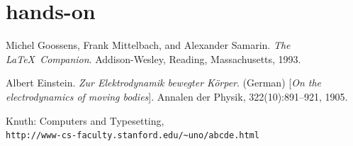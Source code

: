 \documentclass{beamer}
\begin{document}
\section{hands-on}


\begin{thebibliography}{9}
Michel Goossens, Frank Mittelbach, and Alexander Samarin. 
\textit{The \LaTeX\ Companion}. 
Addison-Wesley, Reading, Massachusetts, 1993.

Albert Einstein. 
\textit{Zur Elektrodynamik bewegter K{\"o}rper}. (German) [\textit{On the electrodynamics of moving bodies}]. 
Annalen der Physik, 322(10):891–921, 1905.

Knuth: Computers and Typesetting,
\\\texttt{http://www-cs-faculty.stanford.edu/\~{}uno/abcde.html}
\end{thebibliography}
\end{document}

